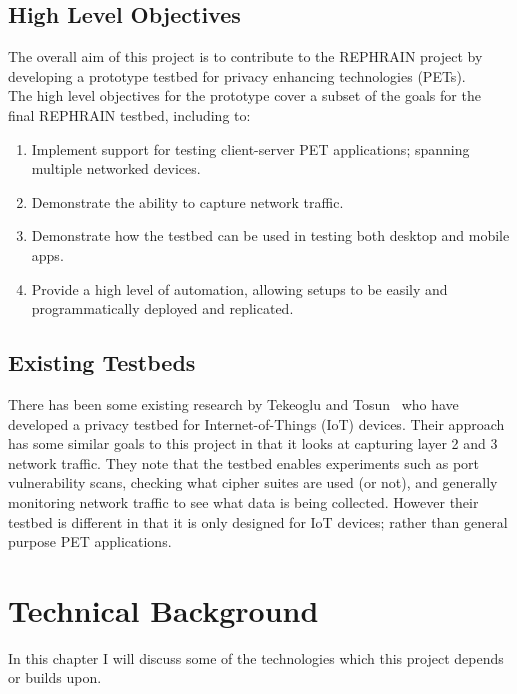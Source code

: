 \documentclass[
    author={Jacob Daniel Halsey},
    supervisor={Prof. Awais Rashid},
    degree={BSc},
    title={Building a Testbed for Evaluating Privacy Enhancing Technologies  (PETs)},
    subtitle={},
    type={software development},
    year={2021}
]{dissertation}
\begin{document}
\section{High Level Objectives}
\label{sect:objectives}

The overall aim of this project is to contribute to the REPHRAIN project
by developing a prototype testbed for privacy enhancing technologies (PETs). \\

The high level objectives for the prototype cover a subset 
of the goals for the final REPHRAIN testbed, including to:

\begin{enumerate}
	\item Implement support for testing client-server PET applications; spanning multiple
	networked devices.
	\item Demonstrate the ability to capture network traffic.
	\item Demonstrate how the testbed can be used in testing both desktop and mobile apps.
	\item Provide a high level of automation, allowing setups to be easily 
	and programmatically deployed and replicated.
\end{enumerate}

\section{Existing Testbeds}

There has been some existing research by Tekeoglu and Tosun~\cite{tekeoglu_2016_testbed} who have developed 
a privacy testbed for Internet-of-Things (IoT) devices. Their approach has some similar goals to this project 
in that it looks at capturing layer 2 and 3 network traffic. They note that the testbed enables experiments such
as port vulnerability scans, checking what cipher suites are used (or not), and generally monitoring 
network traffic to see what data is being collected. However their testbed is different in that it is only designed
for IoT devices; rather than general purpose PET applications.

\chapter{Technical Background}
\label{chap:technical}

In this chapter I will discuss some of the technologies which this project depends or builds upon.
\end{document}
